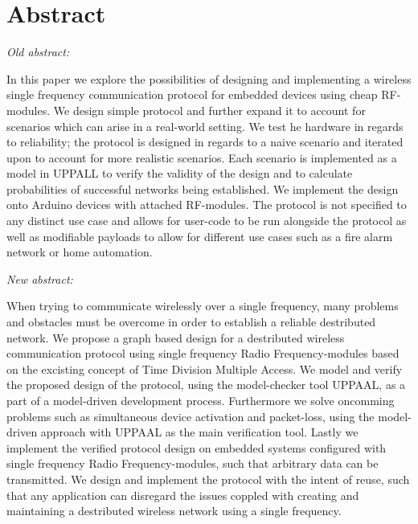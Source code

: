\section{Abstract}
\begin{center}
    \textit{Old abstract:}
\end{center}
In this paper we explore the possibilities of designing and implementing a wireless single frequency communication protocol for embedded devices using cheap RF-modules.
We design simple protocol and further expand it to account for scenarios which can arise in a real-world setting.
We test he hardware in regards to reliability; the protocol is designed in regards to a naive scenario and iterated upon to account for more realistic scenarios.
Each scenario is implemented as a model in UPPALL to verify the validity of the design and to calculate probabilities of successful networks being established.
We implement the design onto Arduino devices with attached RF-modules.
The protocol is not specified to any distinct use case and allows for user-code to be run alongside the protocol as well as modifiable payloads to allow for different use cases such as a fire alarm network or home automation. 
\begin{center}
    \textit{New abstract:}
\end{center}
When trying to communicate wirelessly over a single frequency, many problems and obstacles must be overcome in order to establish a reliable destributed network. 
We propose a graph based design for a destributed wireless communication protocol using single frequency Radio Frequency-modules based on the excisting concept of Time Division Multiple Access. 
We model and verify the proposed design of the protocol, using the model-checker tool UPPAAL, as a part of a model-driven development process. 
Furthermore we solve oncomming problems such as simultaneous device activation and packet-loss, using the model-driven approach with UPPAAL as the main verification tool. 
Lastly we implement the verified protocol design on embedded systems configured with single frequency Radio Frequency-modules, such that arbitrary data can be transmitted. 
We design and implement the protocol with the intent of reuse, such that any application can disregard the issues coppled with creating and maintaining a destributed wireless network using a single frequency.
